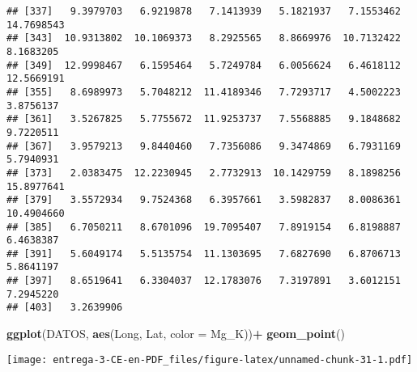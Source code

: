 \documentclass[
]{article}
\newenvironment{Shaded}{\begin{snugshade}}{\end{snugshade}}
\newcommand{\DataTypeTok}[1]{\textcolor[rgb]{0.13,0.29,0.53}{#1}}
\newcommand{\DecValTok}[1]{\textcolor[rgb]{0.00,0.00,0.81}{#1}}
\newcommand{\KeywordTok}[1]{\textcolor[rgb]{0.13,0.29,0.53}{\textbf{#1}}}
\newcommand{\NormalTok}[1]{#1}
\newcommand{\OperatorTok}[1]{\textcolor[rgb]{0.81,0.36,0.00}{\textbf{#1}}}
\newcommand{\StringTok}[1]{\textcolor[rgb]{0.31,0.60,0.02}{#1}}
\begin{document}
\begin{verbatim}
## [337]   9.3979703   6.9219878   7.1413939   5.1821937   7.1553462  14.7698543
## [343]  10.9313802  10.1069373   8.2925565   8.8669976  10.7132422   8.1683205
## [349]  12.9998467   6.1595464   5.7249784   6.0056624   6.4618112  12.5669191
## [355]   8.6989973   5.7048212  11.4189346   7.7293717   4.5002223   3.8756137
## [361]   3.5267825   5.7755672  11.9253737   7.5568885   9.1848682   9.7220511
## [367]   3.9579213   9.8440460   7.7356086   9.3474869   6.7931169   5.7940931
## [373]   2.0383475  12.2230945   2.7732913  10.1429759   8.1898256  15.8977641
## [379]   3.5572934   9.7524368   6.3957661   3.5982837   8.0086361  10.4904660
## [385]   6.7050211   8.6701096  19.7095407   7.8919154   6.8198887   6.4638387
## [391]   5.6049174   5.5135754  11.1303695   7.6827690   6.8706713   5.8641197
## [397]   8.6519641   6.3304037  12.1783076   7.3197891   3.6012151   7.2945220
## [403]   3.2639906
\end{verbatim}

\begin{Shaded}
\begin{Highlighting}[]
\KeywordTok{ggplot}\NormalTok{(DATOS, }\KeywordTok{aes}\NormalTok{(Long, Lat, }\DataTypeTok{color =}\NormalTok{ Mg_K))}\OperatorTok{+}
\StringTok{  }\KeywordTok{geom_point}\NormalTok{()}
\end{Highlighting}
\end{Shaded}

\texttt{[image: entrega-3-CE-en-PDF\_files/figure-latex/unnamed-chunk-31-1.pdf]}

\begin{Shaded}
\end{Shaded}
\end{document}
